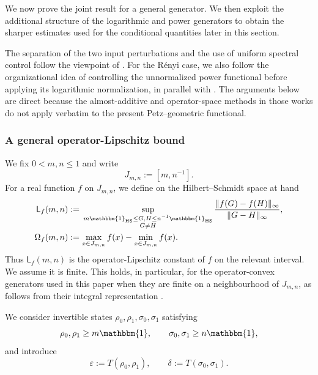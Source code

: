\documentclass[11pt]{article}
\theoremstyle{remark}
\newcommand{\1}{\mathbbm{1}}
\begin{document}
We now prove the joint result for a general generator.  We then
exploit the additional structure of the logarithmic and power
generators to obtain the sharper estimates used for the conditional
quantities later in this section.

The separation of the two input perturbations and the use of uniform
spectral control follow the viewpoint of
\cite[Sections~4 and~5.3]{bluhm2023continuity}.  For the R\'enyi case,
we also follow the organizational idea of controlling the unnormalized
power functional before applying its logarithmic normalization, in
parallel with \cite[Example~4.3 and the proof of Theorem~4.4]{bluhm2026unified}.
The arguments below are direct because the almost-additive and
operator-space methods in those works do not apply verbatim to the
present Petz--geometric functional.

\subsubsection{A general operator-Lipschitz bound}
\label{subsec:joint-continuity-general-tf}

We fix $0<m,n\leq1$ and write
\begin{equation}
 J_{m,n}:=[m,n^{-1}].
 \label{eq:general-tf-spectral-interval}
\end{equation}
For a real function $f$ on $J_{m,n}$, we define on the
Hilbert--Schmidt space at hand
\begin{align}
 \mathsf L_f(m,n)
 &:={}\sup_{\substack{m\1_{\rm HS}\leq G,H\leq
                                n^{-1}\1_{\rm HS}\\
             G\neq H}}
 \frac{\lVert f(G)-f(H)\rVert_\infty}
      {\lVert G-H\rVert_\infty},
 \label{eq:operator-Lipschitz-constant-tf}\\
 \Omega_f(m,n)
 &:=\max_{x\in J_{m,n}}f(x)-\min_{x\in J_{m,n}}f(x).
 \label{eq:oscillation-constant-tf}
\end{align}
Thus $\mathsf L_f(m,n)$ is the operator-Lipschitz constant of $f$
on the relevant interval.  We assume it is finite.  This holds, in
particular, for the operator-convex generators used in this paper
when they are finite on a neighbourhood of $J_{m,n}$, as follows
from their integral representation
\cite[Theorem~V.4.6 and Eq.~(V.31), pp.~133--134]
{bhatia1997matrix}.

We consider invertible states $\rho_0,\rho_1,\sigma_0,\sigma_1$ satisfying
\begin{equation}
 \rho_0,\rho_1\geq m\1,
 \qquad
 \sigma_0,\sigma_1\geq n\1,
 \label{eq:general-tf-slab}
\end{equation}
and introduce
\begin{equation}
 \varepsilon:=T(\rho_0,\rho_1),
 \qquad
 \delta:=T(\sigma_0,\sigma_1).
 \label{eq:general-tf-distances}
\end{equation}
\end{document}
